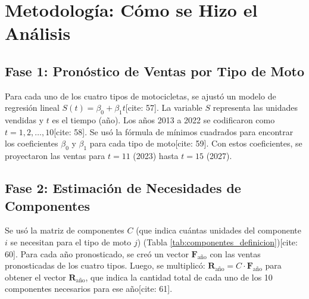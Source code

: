 \documentclass[12pt,a4paper]{article}
\begin{document}
\section{Metodología: Cómo se Hizo el Análisis}
\subsection{Fase 1: Pronóstico de Ventas por Tipo de Moto}
Para cada uno de los cuatro tipos de motocicletas, se ajustó un modelo de regresión lineal $S(t) = \beta_0 + \beta_1 t$[cite: 57]. La variable $S$ representa las unidades vendidas y $t$ es el tiempo (año). Los años 2013 a 2022 se codificaron como $t=1, 2, \ldots, 10$[cite: 58]. Se usó la fórmula de mínimos cuadrados para encontrar los coeficientes $\beta_0$ y $\beta_1$ para cada tipo de moto[cite: 59]. Con estos coeficientes, se proyectaron las ventas para $t=11$ (2023) hasta $t=15$ (2027).

\subsection{Fase 2: Estimación de Necesidades de Componentes}
Se usó la matriz de componentes $C$ (que indica cuántas unidades del componente $i$ se necesitan para el tipo de moto $j$) (Tabla \ref{tab:componentes_definicion})[cite: 60]. Para cada año pronosticado, se creó un vector $\mathbf{F}_{\text{año}}$ con las ventas pronosticadas de los cuatro tipos. Luego, se multiplicó: $\mathbf{R}_{\text{año}} = C \cdot \mathbf{F}_{\text{año}}$ para obtener el vector $\mathbf{R}_{\text{año}}$, que indica la cantidad total de cada uno de los 10 componentes necesarios para ese año[cite: 61].
\end{document}
